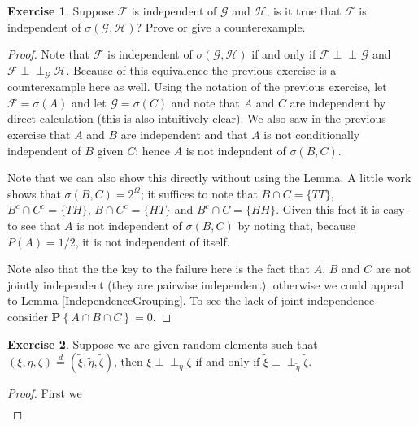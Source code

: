 \documentclass{amsbook}
\theoremstyle{definition}
\newtheorem{xca}{Exercise}
\theoremstyle{remark}
\newcommand{\Independent}{\perp \! \! \! \perp}
\newcommand{\cindependent}[3]{#1 \Independent_{#3} #2}
\newcommand{\probability}[1]{\textbf{P}\left \{#1 \right \}}
\newcommand{\eqdist}{\overset{d}=}
\begin{document}
\begin{xca}Suppose $\mathcal{F}$ is independent of $\mathcal{G}$ and
  $\mathcal{H}$, is it true that $\mathcal{F}$ is independent of
  $\sigma(\mathcal{G}, \mathcal{H})$?  Prove or give a counterexample.
\end{xca}
\begin{proof}
Note that $\mathcal{F}$ is independent of
  $\sigma(\mathcal{G}, \mathcal{H})$ if and only if
  $\cindependent{\mathcal{F}}{\mathcal{G}}{}$
and $\cindependent{\mathcal{F}}{\mathcal{H}}{\mathcal{G}}$.  Because
of this equivalence the previous exercise is a counterexample here as
well.  Using the
notation of the previous exercise, let $\mathcal{F} = \sigma(A)$ and
let $\mathcal{G} = \sigma(C)$ and note that $A$ and $C$ are
independent
by direct calculation (this is also intuitively clear).  We also saw
in the previous exercise that $A$ and $B$ are independent and that $A$
is not conditionally independent of $B$ given $C$; hence $A$ is not
indepndent of $\sigma(B,C)$.

Note that we can also show this directly without using the Lemma. A
little work shows that $\sigma(B,C) = 2^\Omega$; it suffices to
note that $B \cap C = \lbrace TT \rbrace$,  $B^c \cap C^c = \lbrace TH
\rbrace$, $B \cap C^c = \lbrace HT \rbrace$ and $B^c \cap C = \lbrace HH
\rbrace$.  Given this fact
it is easy to see that $A$ is not independent of $\sigma(B,C)$ by noting that, because
$P(A) = 1/2$, it is not independent of itself.

Note also that the the key to the failure here is the fact that $A$, $B$
and $C$ are not jointly independent (they are pairwise independent),
otherwise we could appeal to Lemma \ref{IndependenceGrouping}.
To see the lack of joint independence consider $\probability {A \cap B
\cap C} = 0$.
\end{proof}

\begin{xca}Suppose we are given random elements such that $(\xi, \eta,
  \zeta) \eqdist (\tilde{\xi}, \tilde{\eta}, \tilde{\zeta})$, then
  $\cindependent{\xi}{\zeta}{\eta}$ if and only if $\cindependent{\tilde{\xi}}{\tilde{\zeta}}{\tilde{\eta}}$.
\end{xca}
\begin{proof}
First we 
\begin{align*}
\
\end{align*}
\end{proof}
\end{document}
